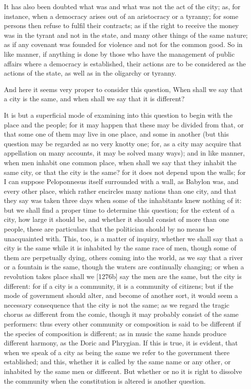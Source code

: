 
It has also been doubted what was and what was not the act of the city;
as, for instance, when a democracy arises out of an aristocracy or a
tyranny; for some persons then refuse to fulfil their contracts; as if the
right to receive the money was in the tyrant and not in the state, and
many other things of the same nature; as if any covenant was founded for
violence and not for the common good. So in like manner, if anything is
done by those who have the management of public affairs where a democracy
is established, their actions are to be considered as the actions of the
state, as well as in the oligarchy or tyranny.

And here it seems very proper to consider this question, When shall we say
that a city is the same, and when shall we say that it is different?

It is but a superficial mode of examining into this question to begin with
the place and the people; for it may happen that these may be divided from
that, or that some one of them may live in one place, and some in another
(but this question may be regarded as no very knotty one; for, as a city
may acquire that appellation on many accounts, it may be solved many
ways); and in like manner, when men inhabit one common place, when shall
we say that they inhabit the same city, or that the city is the same? for
it does not depend upon the walls; for I can suppose Peloponnesus itself
surrounded with a wall, as Babylon was, and every other place, which
rather encircles many nations than one city, and that they say was taken
three days when some of the inhabitants knew nothing of it: but we shall
find a proper time to determine this question; for the extent of a city,
how large it should be, and whether it should consist of more than one
people, these are particulars that the politician should by no means be
unacquainted with. This, too, is a matter of inquiry, whether we shall say
that a city is the same while it is inhabited by the same race of men,
though some of them are perpetually dying, others coming into the world,
as we say that a river or a fountain is the same, though the waters are
continually changing; or when a revolution takes place shall we [1276b]
say the men are the same, but the city is different: for if a city is a
community, it is a community of citizens; but if the mode of government
should alter, and become of another sort, it would seem a necessary
consequence that the city is not the same; as we regard the tragic chorus
as different from the comic, though it may probably consist of the same
performers: thus every other community or composition is said to be
different if the species of composition is different; as in music the same
hands produce different harmony, as the Doric and Phrygian. If this is
true, it is evident, that when we speak of a city as being the same we
refer to the government there established; and this, whether it is called
by the same name or any other, or inhabited by the same men or different.
But whether or no it is right to dissolve the community when the
constitution is altered is another question.

